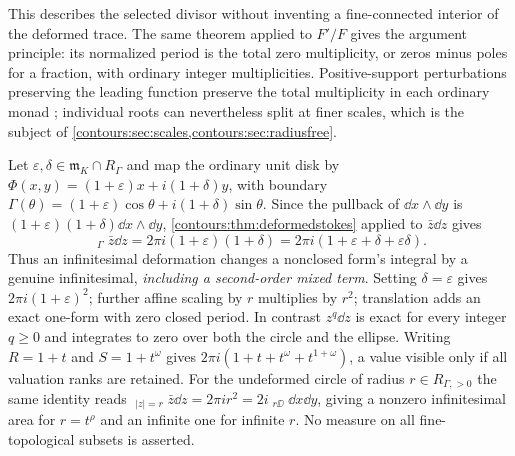 \documentclass[11pt,letterpaper]{article}
\theoremstyle{definition}
\theoremstyle{remark}
\newcommand{\m}{\mathfrak m}\newcommand{\st}{\operatorname{st}}
\newcommand{\HInt}{\mathop{\int^{\!H}}\nolimits}
\newcommand{\HCoint}{\mathop{\oint^{\!H}}\nolimits}
\numberwithin{equation}{section}
\begin{document}
This describes the selected divisor without inventing a fine-connected interior of
the deformed trace. The same theorem applied to $F'/F$ gives the argument
principle: its normalized period is the total zero multiplicity, or zeros minus
poles for a fraction, with ordinary integer multiplicities. Positive-support
perturbations preserving the leading function preserve the total multiplicity in
each ordinary monad \cite{Analysis,Geometry}; individual roots can nevertheless
split at finer scales, which is the subject of
\cref{contours:sec:scales,contours:sec:radiusfree}.

\begin{example}\label{contours:ex:ellipse}
Let $\varepsilon,\delta\in\m_K\cap R_\Gamma$ and map the ordinary unit disk by
$\Phi(x,y)=(1+\varepsilon)x+i(1+\delta)y$, with boundary
$\Gamma(\theta)=(1+\varepsilon)\cos\theta+i(1+\delta)\sin\theta$. Since the
pullback of $\dd x\wedge \dd y$ is $(1+\varepsilon)(1+\delta)\dd x\wedge \dd y$,
\cref{contours:thm:deformedstokes} applied to $\bar z\dd z$ gives
\begin{equation}\label{contours:eq:ellipse}
  \HCoint_\Gamma\bar z\dd z
  =2\pi i(1+\varepsilon)(1+\delta)
  =2\pi i(1+\varepsilon+\delta+\varepsilon\delta).
\end{equation}
Thus an infinitesimal deformation changes a nonclosed form's integral by a genuine
infinitesimal, \emph{including a second-order mixed term}. Setting
$\delta=\varepsilon$ gives $2\pi i(1+\varepsilon)^2$; further affine scaling by $r$
multiplies by $r^2$; translation adds an exact one-form with zero closed period. In
contrast $z^q\dd z$ is exact for every integer $q\ge0$ and integrates to zero over
both the circle and the ellipse. Writing $R=1+t$ and $S=1+t^\omega$ gives
$2\pi i(1+t+t^\omega+t^{1+\omega})$, a value visible only if all valuation ranks are
retained. For the undeformed circle of radius $r\in R_{\Gamma,>0}$ the same identity
reads $\HCoint_{|z|=r}\bar z\dd z=2\pi ir^2=2i\HInt_{r\DD}\dd x\dd y$, giving a
nonzero infinitesimal area for $r=t^\rho$ and an infinite one for infinite $r$. No
measure on all fine-topological subsets is asserted.
\end{example}
\end{document}

